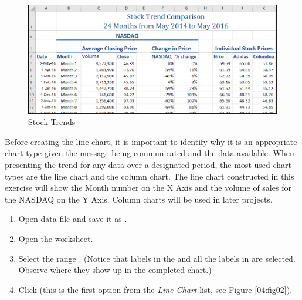 \begin{figure}[H]
	\centering
	\includegraphics[width=\maxwidth{.95\linewidth}]{gfx/ch04_fig01}
	\caption{Stock Trends}
	\label{04:fig01}
\end{figure}

Before creating the line chart, it is important to identify why it is an appropriate chart type given the message being communicated and the data available. When presenting the trend for any data over a designated period, the most used chart types are the line chart and the column chart. The line chart constructed in this exercise will show the Month number on the X Axis and the volume of sales for the NASDAQ on the Y Axis. Column charts will be used in later projects.

\begin{enumbox}
	\begin{enumerate}
		\item Open data file  and save it as .
		\item Open the  worksheet.
		\item Select the range . (Notice that labels in the  and all the labels in  are selected. Observe where they show up in the completed chart.)
		\item Click  (this is the first option from the \textit{Line Chart} list, see Figure \ref{04:fig02}).
	\end{enumerate}
\end{enumbox}
	
